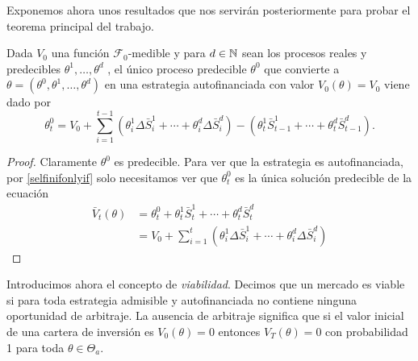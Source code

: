 Exponemos ahora unos resultados que nos servirán posteriormente para probar el teorema principal del trabajo.

\begin{lemaBox}\label{2.2.1}
	Dada $ V_0 $ una función $ \mathcal{F}_0 $-medible y para $ d \in \mathbb{N}  $ sean los procesos reales y predecibles $ \theta^1,\dots,\theta^d $ , el único proceso predecible $ \theta^0 $ que convierte a $ \theta = (\theta^0,\theta^1,\dots,\theta^d) $ en una estrategia autofinanciada con valor $ V_0 (\theta)= V_0 $ viene dado por
	\[
	\theta^0_t = V_0 + \sum_{i=1}^{t-1}(\theta^1_i\Delta\bar{S}^1_i+\cdots+\theta^d_i\Delta\bar{S}^d_i) - (\theta^1_t\bar{S}^1_{t-1}+\cdots+\theta^d_t\bar{S}^d_{t-1}).
	\]
\end{lemaBox}
\begin{proof}
	Claramente $ \theta^0 $ es predecible. Para ver que la estrategia es autofinanciada, por \ref{selfinifonlyif} solo necesitamos ver que $ \theta^0_t $ es la única solución predecible de la ecuación 
	\begin{equation*}
	\begin{split}
	\bar{V}_t(\theta) &= \theta^0_t + \theta^1_t\bar{S}^1_t+\cdots+\theta^d_t\bar{S}^d_t \\
	&= V_0 + \sum_{i=1}^{t}(\theta^1_i\Delta\bar{S}^1_i+\cdots+\theta^d_i\Delta\bar{S}^d_i)
	\end{split}
	\end{equation*}
\end{proof}

Introducimos ahora el concepto de \textit{viabilidad}. Decimos que un mercado es viable si para toda estrategia admisible y autofinanciada no contiene ninguna oportunidad de arbitraje. La ausencia de arbitraje significa que si el valor inicial de una cartera de inversión es $ V_0(\theta) = 0 $ entonces $ V_T(\theta) = 0 $ con probabilidad 1 para toda $ \theta \in\Theta_a $. 

